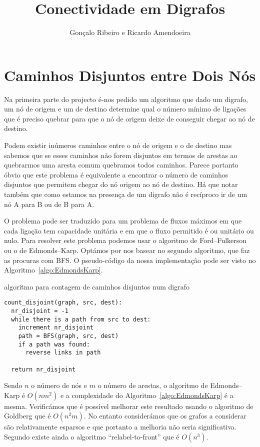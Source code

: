 \documentclass[10pt,a4paper]{article}
\author{Gonçalo Ribeiro e Ricardo Amendoeira}
\title{Conectividade em Digrafos}
\begin{document}

\pagebreak

\section{Caminhos Disjuntos entre Dois Nós}
Na primeira parte do projecto é-nos pedido um algoritmo que dado um digrafo, um nó de origem e um de destino determine qual o número mínimo de ligações que é preciso quebrar para que o nó de origem deixe de conseguir chegar ao nó de destino.

Podem existir inúmeros caminhos entre o nó de origem e o de destino mas sabemos que se esses caminhos não forem disjuntos em termos de arestas ao quebrarmos uma aresta comum quebramos todos caminhos. Parece portanto óbvio que este problema é equivalente a encontrar o número de caminhos disjuntos que permitem chegar do nó origem ao nó de destino. Há que notar também que como estamos na presença de um digrafo não é recíproco ir de um nó A para B ou de B para A.

O problema pode ser traduzido para um problema de fluxos máximos em que cada ligação tem capacidade unitária e em que o fluxo permitido é ou unitário ou nulo. Para resolver este problema podemos usar o algoritmo de Ford--Fulkerson ou o de Edmonds--Karp. Optámos por nos basear no segundo algoritmo, que faz as procuras com BFS. O pseudo-código da nossa implementação pode ser visto no Algoritmo~\ref{algo:EdmondsKarp}.

\begin{algorithm}[h]
\caption{algoritmo para contagem de caminhos disjuntos num digrafo}
\label{algo:EdmondsKarp}
\begin{lstlisting}[linewidth=0.95\linewidth]
count_disjoint(graph, src, dest):
  nr_disjoint = -1
  while there is a path from src to dest:
    increment nr_disjoint
    path = BFS(graph, src, dest)
    if a path was found:
      reverse links in path

  return nr_disjoint
\end{lstlisting}
\end{algorithm}

Sendo $n$ o número de nós e $m$ o número de arestas, o algoritmo de Edmonds--Karp é $O(n m^2)$ e a complexidade do Algoritmo~\ref{algo:EdmondsKarp} é a mesma. Verificámos que é possível melhorar este resultado usando o algoritmo de Goldberg que é $O(n^2 m)$. No entanto considerámos que os grafos a considerar são relativamente esparsos e que portanto a melhoria não seria significativa. Segundo \cite{IntrotoAlgorithms3rd} existe ainda o algoritmo ``relabel-to-front'' que é $O(n^3)$.
\end{document}

